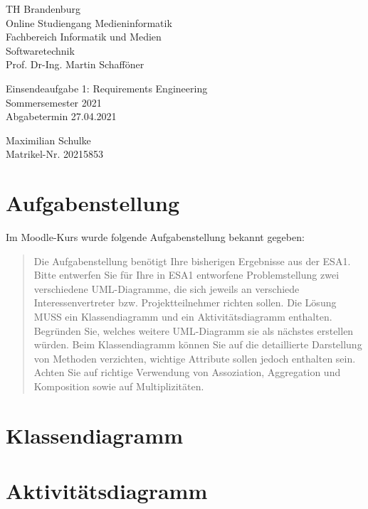 \documentclass{article}
\begin{document}
\begin{titlepage}
	\begin{flushleft}
		TH Brandenburg \\
		Online Studiengang Medieninformatik \\
		Fachbereich Informatik und Medien \\
		Softwaretechnik \\
		Prof. Dr-Ing. Martin Schafföner
	\end{flushleft}

	\vfill

	\begin{center}
		\Large{Einsendeaufgabe 1: Requirements Engineering}\\[0.5em]
		\large{Sommersemester 2021}\\[0.25em]
		\large{Abgabetermin 27.04.2021}
	\end{center}

	\vfill

	\begin{flushright}
		Maximilian Schulke \\
		Matrikel-Nr. 20215853
	\end{flushright}
\end{titlepage}

\tableofcontents

\newpage

\section{Aufgabenstellung}

Im Moodle-Kurs wurde folgende Aufgabenstellung bekannt gegeben:

\begin{quote}
	Die Aufgabenstellung benötigt Ihre bisherigen Ergebnisse aus der ESA1.
	Bitte entwerfen Sie für Ihre in ESA1 entworfene Problemstellung zwei
	verschiedene UML-Diagramme, die sich jeweils an verschiede
	Interessenvertreter bzw. Projektteilnehmer richten sollen. Die Lösung MUSS
	ein Klassendiagramm und ein Aktivitätsdiagramm enthalten. Begründen Sie,
	welches weitere UML-Diagramm sie als nächstes erstellen würden. Beim
	Klassendiagramm können Sie auf die detaillierte Darstellung von Methoden
	verzichten, wichtige Attribute sollen jedoch enthalten sein. Achten Sie auf
	richtige Verwendung von Assoziation, Aggregation und Komposition sowie auf
	Multiplizitäten.
\end{quote}

\section{Klassendiagramm}


\section{Aktivitätsdiagramm}



\end{document}
